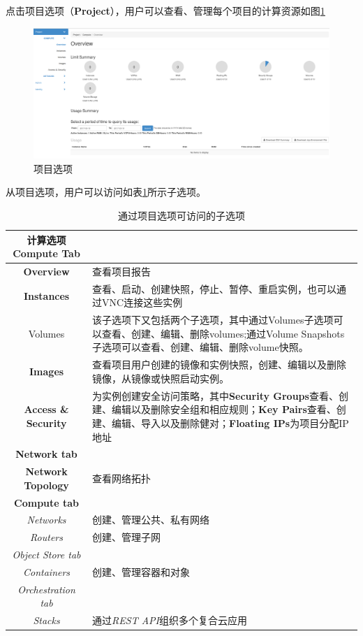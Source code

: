 \documentclass[12pt]{article}
\begin{document}
点击项目选项（\textbf{Project}），用户可以查看、管理每个项目的计算资源如图\ref{fig:projectOverview}
\begin{figure}[!htb]
\centering
\includegraphics[width=6in]{./figures/projectOverview}
\caption{项目选项}
\label{fig:projectOverview}
\end{figure}
从项目选项，用户可以访问如表\ref{tab:project}所示子选项。
\begin{table}[!htb]
\centering
\caption{通过项目选项可访问的子选项}  \label{tab:project}
\begin{tabular}{c|p{8cm}} \hline
计算选项\textbf{Compute Tab} & \\ \hline
\textbf{Overview}& 查看项目报告\\ \hline
\textbf{Instances} & 查看、启动、创建快照，停止、暂停、重启实例，也可以通过VNC连接这些实例\\ \hline
Volumes & 该子选项下又包括两个子选项，其中通过Volumes子选项可以查看、创建、编辑、删除volumes;通过Volume Snapshots子选项可以查看、创建、编辑、删除volume快照。 \\ \hline
\textbf{Images} & 查看项目用户创建的镜像和实例快照，创建、编辑以及删除镜像，从镜像或快照启动实例。 \\ \hline
\textbf{Access \& Security} & 为实例创建安全访问策略，其中\textbf{Security Groups}查看、创建、编辑以及删除安全组和相应规则；\textbf{Key Pairs}查看、创建、编辑、导入以及删除健对；\textbf{Floating IPs}为项目分配IP地址 \\ \hline
\textbf{Network tab} &  \\ \hline
\textbf{Network Topology} & 查看网络拓扑 \\ \hline
\textbf{Compute tab} &  \\ \hline
\textit{Networks} & 创建、管理公共、私有网络 \\ \hline
\textit{Routers} & 创建、管理子网 \\
\textit{Object Store tab}& \\ \hline
\textit{Containers} & 创建、管理容器和对象 \\ \hline
\textit{Orchestration tab} &  \\
\textit{Stacks}& 通过\textit{REST API}组织多个复合云应用 \\ \hline
\end{tabular}
\end{table}
\end{document}
